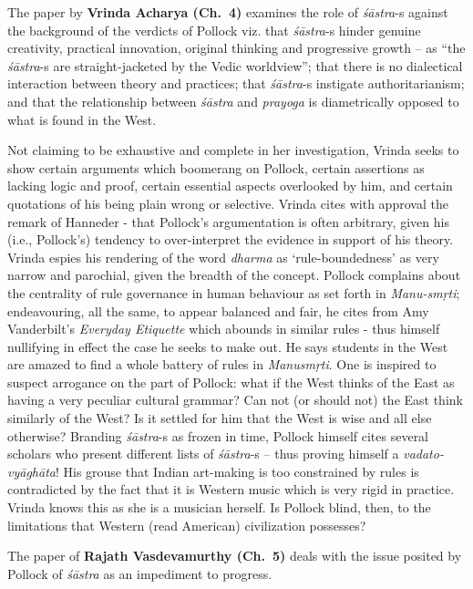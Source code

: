 The paper by {\bf Vrinda Acharya (Ch.~4)} examines the role of \hbox{{\sl śāstra}-s} against the background of the verdicts of Pollock viz. that {\sl śāstra}-s hinder genuine creativity, practical innovation, original thinking and progressive growth -- as “the {\sl śāstra}-s are straight-jacketed by the Vedic worldview”; that there is no dialectical interaction between theory and practices; that {\sl śāstra}-s instigate authoritarianism; and that the relationship between {\sl śāstra} and {\sl prayoga} is diametrically opposed to what is found in the West.

Not claiming to be exhaustive and complete in her investigation, Vrinda seeks to show certain arguments which boomerang on Pollock, certain assertions as lacking logic and proof, certain essential aspects overlooked by him, and certain quotations of his being plain wrong or selective. Vrinda cites with approval the remark of Hanneder - that Pollock’s argumentation is often arbitrary, given his (i.e., Pollock's) tendency to over-interpret the evidence in support of his theory. Vrinda espies his rendering of the word {\sl dharma} as ‘rule-boundedness’ as very narrow and parochial, given the breadth of the concept. Pollock complains about the centrality of rule governance in human behaviour as set forth in {\sl Manu-smṛti}; endeavouring, all the same, to appear balanced and fair, he cites from Amy Vanderbilt’s {\sl Everyday Etiquette} which abounds in similar rules - thus himself nullifying in effect the case he seeks to make out. He says students in the West are amazed to find a whole battery of rules in {\sl Manusmṛti}. One is inspired to suspect arrogance on the part of Pollock: what if the West thinks of the East as having a very peculiar cultural grammar? Can not (or should not) the East think similarly of the West? Is it settled for him that the West is wise and all else otherwise? Branding {\sl śāstra}-s as frozen in time, Pollock himself cites several scholars who present different lists of {\sl śāstra}-s -- thus proving himself a {\sl vadato-vyāghāta}! His grouse that Indian art-making is too constrained by rules is contradicted by the fact that it is Western music which is very rigid in practice. Vrinda knows this as she is a musician herself. Is Pollock blind, then, to the limitations that Western (read American) civilization possesses?
\vskip 5pt

The paper of {\bf Rajath Vasdevamurthy (Ch.~5)} deals with the issue posited by Pollock  of {\sl śāstra} as an impediment to progress.

